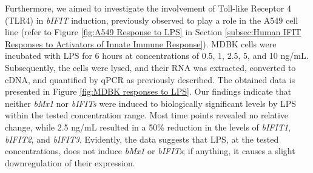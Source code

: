 Furthermore, we aimed to investigate the involvement of Toll-like Receptor 4 (TLR4) in \textit{bIFIT} induction, previously observed to play a role in the A549 cell line (refer to Figure \ref{fig:A549 Response to LPS} in Section \ref{subsec:Human IFIT Responses to Activators of Innate Immune Response}). MDBK cells were incubated with LPS for 6 hours at concentrations of 0.5, 1, 2.5, 5, and 10 ng/mL. Subsequently, the cells were lysed, and their RNA was extracted, converted to cDNA, and quantified by qPCR as previously described. The obtained data is presented in Figure \ref{fig:MDBK responses to LPS}. Our findings indicate that neither \textit{bMx1} nor \textit{bIFITs} were induced to biologically significant levels by LPS within the tested concentration range. Most time points revealed no relative change, while 2.5 ng/mL resulted in a 50\% reduction in the levels of \textit{bIFIT1}, \textit{bIFIT2}, and \textit{bIFIT3}. Evidently, the data suggests that LPS, at the tested concentrations, does not induce \textit{bMx1} or \textit{bIFITs}; if anything, it causes a slight downregulation of their expression. 

